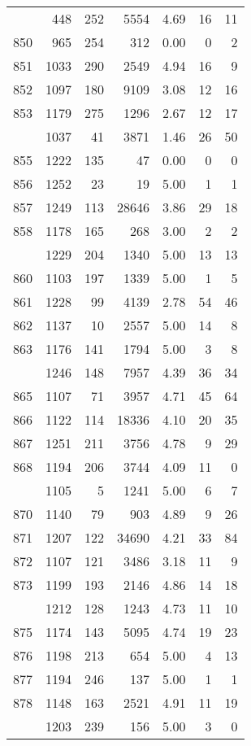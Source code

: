\documentclass[
]{article}
\begin{document}
\begin{table}
\begin{tabular}[t]{lrrrrrr}
\addlinespace
849 & 448 & 252 & 5554 & 4.69 & 16 & 11\\
850 & 965 & 254 & 312 & 0.00 & 0 & 2\\
851 & 1033 & 290 & 2549 & 4.94 & 16 & 9\\
852 & 1097 & 180 & 9109 & 3.08 & 12 & 16\\
853 & 1179 & 275 & 1296 & 2.67 & 12 & 17\\
\addlinespace
854 & 1037 & 41 & 3871 & 1.46 & 26 & 50\\
855 & 1222 & 135 & 47 & 0.00 & 0 & 0\\
856 & 1252 & 23 & 19 & 5.00 & 1 & 1\\
857 & 1249 & 113 & 28646 & 3.86 & 29 & 18\\
858 & 1178 & 165 & 268 & 3.00 & 2 & 2\\
\addlinespace
859 & 1229 & 204 & 1340 & 5.00 & 13 & 13\\
860 & 1103 & 197 & 1339 & 5.00 & 1 & 5\\
861 & 1228 & 99 & 4139 & 2.78 & 54 & 46\\
862 & 1137 & 10 & 2557 & 5.00 & 14 & 8\\
863 & 1176 & 141 & 1794 & 5.00 & 3 & 8\\
\addlinespace
864 & 1246 & 148 & 7957 & 4.39 & 36 & 34\\
865 & 1107 & 71 & 3957 & 4.71 & 45 & 64\\
866 & 1122 & 114 & 18336 & 4.10 & 20 & 35\\
867 & 1251 & 211 & 3756 & 4.78 & 9 & 29\\
868 & 1194 & 206 & 3744 & 4.09 & 11 & 0\\
\addlinespace
869 & 1105 & 5 & 1241 & 5.00 & 6 & 7\\
870 & 1140 & 79 & 903 & 4.89 & 9 & 26\\
871 & 1207 & 122 & 34690 & 4.21 & 33 & 84\\
872 & 1107 & 121 & 3486 & 3.18 & 11 & 9\\
873 & 1199 & 193 & 2146 & 4.86 & 14 & 18\\
\addlinespace
874 & 1212 & 128 & 1243 & 4.73 & 11 & 10\\
875 & 1174 & 143 & 5095 & 4.74 & 19 & 23\\
876 & 1198 & 213 & 654 & 5.00 & 4 & 13\\
877 & 1194 & 246 & 137 & 5.00 & 1 & 1\\
878 & 1148 & 163 & 2521 & 4.91 & 11 & 19\\
\addlinespace
879 & 1203 & 239 & 156 & 5.00 & 3 & 0\\

\end{tabular}
\end{table}
\end{document}

